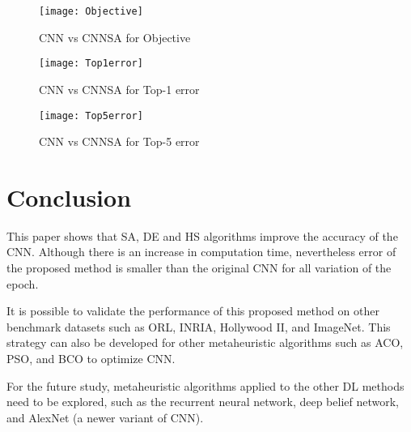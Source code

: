 \documentclass[10pt,letterpaper]{article}
\begin{document}
\begin{figure}
    \texttt{[image: Objective]}
    \caption{CNN vs CNNSA for Objective}
    \label{fig:my_label}
\end{figure}

\begin{figure}
    \texttt{[image: Top1error]}
    \caption{CNN vs CNNSA for Top-1 error}
    \label{fig:my_label}
\end{figure}

\begin{figure}
    \texttt{[image: Top5error]}
    \caption{CNN vs CNNSA for Top-5 error}
    \label{fig:my_label}
\end{figure}


\section{Conclusion}
This paper shows that SA, DE and HS algorithms improve the accuracy of the CNN. Although there is an increase in computation time, nevertheless error of the proposed method is smaller than the original CNN for all variation of the epoch.

It is possible to validate the performance of this proposed method on other benchmark datasets such as ORL, INRIA, Hollywood II, and ImageNet. This strategy can also be developed for other metaheuristic algorithms such as ACO, PSO, and BCO to optimize CNN. 

For the future study, metaheuristic algorithms applied to the other DL methods need to be explored, such as the recurrent neural network, deep belief network, and AlexNet (a newer variant of CNN). 








\end{document}
